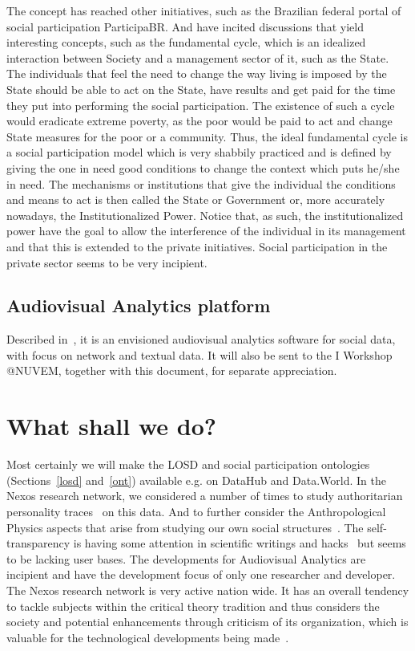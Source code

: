 \documentclass[letterpaper,10pt]{article}
\begin{document}
The concept has reached other initiatives, such
as the Brazilian federal portal of social participation
ParticipaBR.
And have incited discussions that yield interesting concepts,
such as the fundamental cycle,
which is an idealized interaction between
Society and a management sector of it,
such as the State.
The individuals that feel the need to
change the way living is imposed by the State
should be able to act on the State,
have results and get paid for the time they put
into performing the social participation.
The existence of such a cycle would eradicate
extreme poverty, as the poor would be paid
to act and change State measures for the poor
or a community.
Thus, the ideal fundamental cycle is a social
participation model which is very shabbily practiced
and is defined by giving the one in need good conditions
to change the context which puts he/she in need.
The mechanisms or institutions that give the
individual the conditions and means to act
is then called the State or Government or,
more accurately nowadays, the Institutionalized Power.
Notice that, as such, the institutionalized power
have the goal to allow the interference 
of the individual in its management
and that this is extended to the private initiatives.
Social participation in the private sector
seems to be very incipient.



\subsection{Audiovisual Analytics platform}
Described in~\cite{nuvem2}, it is an envisioned audiovisual analytics
software for social data, with focus on network and textual data.
It will also be sent to the I Workshop @NUVEM, together with
this document, for separate appreciation.

\section{What shall we do?}
Most certainly we will
make the LOSD and social participation ontologies (Sections~\ref{losd} and~\ref{ont})
available e.g. on DataHub and Data.World.
In the Nexos research network, we
considered a number of times to study authoritarian personality traces~\cite{au}
on this data.
And to further consider the Anthropological Physics aspects that
arise from studying our own social structures~\cite{an,an2}.
The self-transparency is having some attention in scientific writings
and hacks~\cite{aa,aa2} but seems to be lacking user bases.
The developments for Audiovisual Analytics are incipient
and have the development focus of only one researcher and developer.
The Nexos research network is very active nation wide.
It has an overall tendency to tackle subjects within the
critical theory tradition and thus considers the society
and potential enhancements through criticism of its organization,
which is valuable for the technological developments being made~\cite{nexos1}.
\end{document}
